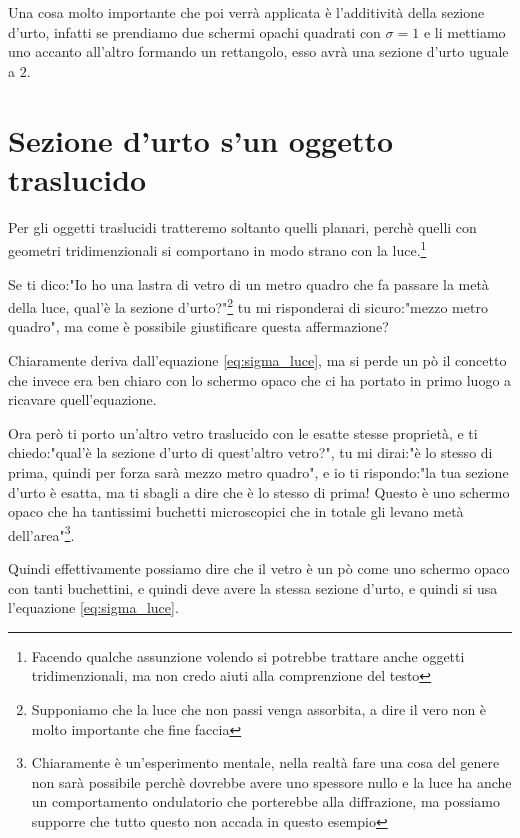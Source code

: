 \documentclass[11pt,a4paper]{article}
\begin{document}
		Una cosa molto importante che poi verrà applicata è l'additività della sezione d'urto, infatti se prendiamo due schermi opachi quadrati con $\sigma=1$ e li mettiamo uno accanto all'altro formando un rettangolo, esso avrà una sezione d'urto uguale a $2$.

	\section{Sezione d'urto s'un oggetto traslucido}
		Per gli oggetti traslucidi tratteremo soltanto quelli planari, perchè quelli con geometri tridimenzionali si comportano in modo strano con la luce.\footnote{Facendo qualche assunzione volendo si potrebbe trattare anche oggetti tridimenzionali, ma non credo aiuti alla comprenzione del testo}\newline

		Se ti dico:"Io ho una lastra di vetro di un metro quadro che fa passare la metà della luce, qual'è la sezione d'urto?"\footnote{Supponiamo che la luce che non passi venga assorbita, a dire il vero non è molto importante che fine faccia} tu mi risponderai di sicuro:"mezzo metro quadro", ma come è possibile giustificare questa affermazione?\newline

		Chiaramente deriva dall'equazione \ref{eq:sigma_luce}, ma si perde un pò il concetto che invece era ben chiaro con lo schermo opaco che ci ha portato in primo luogo a ricavare quell'equazione.\newline

		Ora però ti porto un'altro vetro traslucido con le esatte stesse proprietà, e ti chiedo:"qual'è la sezione d'urto di quest'altro vetro?", tu mi dirai:"è lo stesso di prima, quindi per forza sarà mezzo metro quadro", e io ti rispondo:"la tua sezione d'urto è esatta, ma ti sbagli a dire che è lo stesso di prima! Questo è uno schermo opaco che ha tantissimi buchetti microscopici che in totale gli levano metà dell'area"\footnote{Chiaramente è un'esperimento mentale, nella realtà fare una cosa del genere non sarà possibile perchè dovrebbe avere uno spessore nullo e la luce ha anche un comportamento ondulatorio che porterebbe alla diffrazione, ma possiamo supporre che tutto questo non accada in questo esempio}.\newline

		Quindi effettivamente possiamo dire che il vetro è un pò come uno schermo opaco con tanti buchettini, e quindi deve avere la stessa sezione d'urto, e quindi si usa l'equazione \ref{eq:sigma_luce}.\newline
\end{document}
